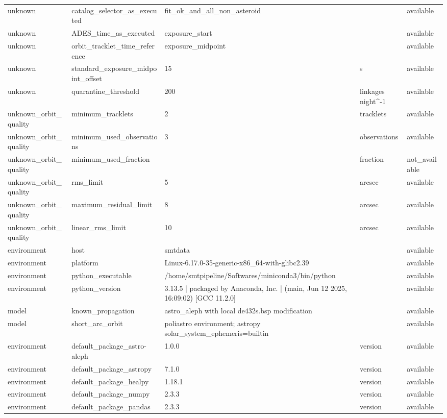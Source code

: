 \begin{tabular}{lllll}
unknown & catalog\_selector\_as\_executed & fit\_ok\_and\_all\_non\_asteroid &  & available \\
unknown & ADES\_time\_as\_executed & exposure\_start &  & available \\
unknown & orbit\_tracklet\_time\_reference & exposure\_midpoint &  & available \\
unknown & standard\_exposure\_midpoint\_offset & 15 & s & available \\
unknown & quarantine\_threshold & 200 & linkages night\textasciicircum -1 & available \\
unknown\_orbit\_quality & minimum\_tracklets & 2 & tracklets & available \\
unknown\_orbit\_quality & minimum\_used\_observations & 3 & observations & available \\
unknown\_orbit\_quality & minimum\_used\_fraction &  & fraction & not\_available \\
unknown\_orbit\_quality & rms\_limit & 5 & arcsec & available \\
unknown\_orbit\_quality & maximum\_residual\_limit & 8 & arcsec & available \\
unknown\_orbit\_quality & linear\_rms\_limit & 10 & arcsec & available \\
environment & host & smtdata &  & available \\
environment & platform & Linux-6.17.0-35-generic-x86\_64-with-glibc2.39 &  & available \\
environment & python\_executable & /home/smtpipeline/Softwares/miniconda3/bin/python &  & available \\
environment & python\_version & 3.13.5 | packaged by Anaconda, Inc. | (main, Jun 12 2025, 16:09:02) [GCC 11.2.0] &  & available \\
model & known\_propagation & astro\_aleph with local de432s.bsp modification &  & available \\
model & short\_arc\_orbit & poliastro environment; astropy solar\_system\_ephemeris=builtin &  & available \\
environment & default\_package\_astro-aleph & 1.0.0 & version & available \\
environment & default\_package\_astropy & 7.1.0 & version & available \\
environment & default\_package\_healpy & 1.18.1 & version & available \\
environment & default\_package\_numpy & 2.3.3 & version & available \\
environment & default\_package\_pandas & 2.3.3 & version & available \\

\end{tabular}
